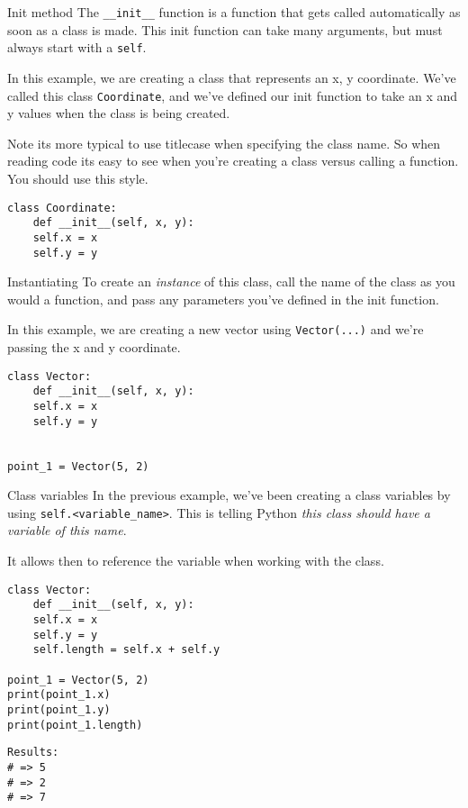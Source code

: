 \documentclass[10pt]{beamer}
\begin{document}
\begin{frame}[label={sec:orgc9ff9ac},fragile]{Init method}
 The \texttt{\_\_init\_\_} function is a function that gets called automatically as soon as a class
is made. This init function can take many arguments, but must always start with a
\texttt{self}.

In this example, we are creating a class that represents an x, y coordinate. We've
called this class \texttt{Coordinate}, and we've defined our init function to take an x and y
values when the class is being created.

\alert{Note} its more typical to use titlecase when specifying the class name. So when
reading code its easy to see when you're creating a class versus calling a
function. You should use this style.

\begin{verbatim}
class Coordinate:
    def __init__(self, x, y):
	self.x = x
	self.y = y
\end{verbatim}
\end{frame}

\begin{frame}[label={sec:orge903ad1},fragile]{Instantiating}
 To create an \emph{instance} of this class, call the name of the class as you would a
function, and pass any parameters you've defined in the init function.

In this example, we are creating a new vector using \texttt{Vector(...)} and we're passing the
x and y coordinate.

\begin{verbatim}
class Vector:
    def __init__(self, x, y):
	self.x = x
	self.y = y


point_1 = Vector(5, 2)
\end{verbatim}
\end{frame}

\begin{frame}[label={sec:org991d30a},fragile]{Class variables}
 In the previous example, we've been creating a class variables by using
\texttt{self.<variable\_name>}. This is telling Python \emph{this class should have a variable of
this name}.

It allows then to reference the variable when working with the class.

\begin{verbatim}
class Vector:
    def __init__(self, x, y):
	self.x = x
	self.y = y
	self.length = self.x + self.y

point_1 = Vector(5, 2)
print(point_1.x)
print(point_1.y)
print(point_1.length)
\end{verbatim}

\begin{verbatim}
Results: 
# => 5
# => 2
# => 7
\end{verbatim}
\end{frame}
\end{document}
